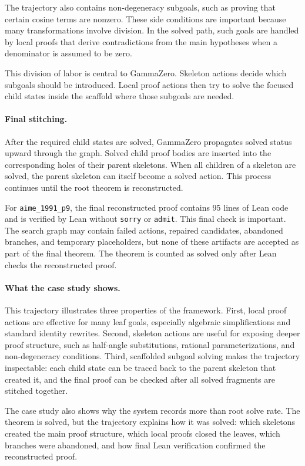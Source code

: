 \documentclass[en]{uet_awesome_thesis/uet-awesome-thesis}
\begin{document}
\begin{appendices}
The trajectory also contains non-degeneracy subgoals, such as proving that certain cosine terms are nonzero. These side conditions are important because many transformations involve division. In the solved path, such goals are handled by local proofs that derive contradictions from the main hypotheses when a denominator is assumed to be zero.

This division of labor is central to GammaZero. Skeleton actions decide which subgoals should be introduced. Local proof actions then try to solve the focused child states inside the scaffold where those subgoals are needed.

\paragraph{Final stitching.}
After the required child states are solved, GammaZero propagates solved status upward through the graph. Solved child proof bodies are inserted into the corresponding holes of their parent skeletons. When all children of a skeleton are solved, the parent skeleton can itself become a solved action. This process continues until the root theorem is reconstructed.

For \texttt{aime\_1991\_p9}, the final reconstructed proof contains 95 lines of Lean code and is verified by Lean without \texttt{sorry} or \texttt{admit}. This final check is important. The search graph may contain failed actions, repaired candidates, abandoned branches, and temporary placeholders, but none of these artifacts are accepted as part of the final theorem. The theorem is counted as solved only after Lean checks the reconstructed proof.

\paragraph{What the case study shows.}
This trajectory illustrates three properties of the framework. First, local proof actions are effective for many leaf goals, especially algebraic simplifications and standard identity rewrites. Second, skeleton actions are useful for exposing deeper proof structure, such as half-angle substitutions, rational parameterizations, and non-degeneracy conditions. Third, scaffolded subgoal solving makes the trajectory inspectable: each child state can be traced back to the parent skeleton that created it, and the final proof can be checked after all solved fragments are stitched together.

The case study also shows why the system records more than root solve rate. The theorem is solved, but the trajectory explains how it was solved: which skeletons created the main proof structure, which local proofs closed the leaves, which branches were abandoned, and how final Lean verification confirmed the reconstructed proof.


\end{appendices}
\end{document}
